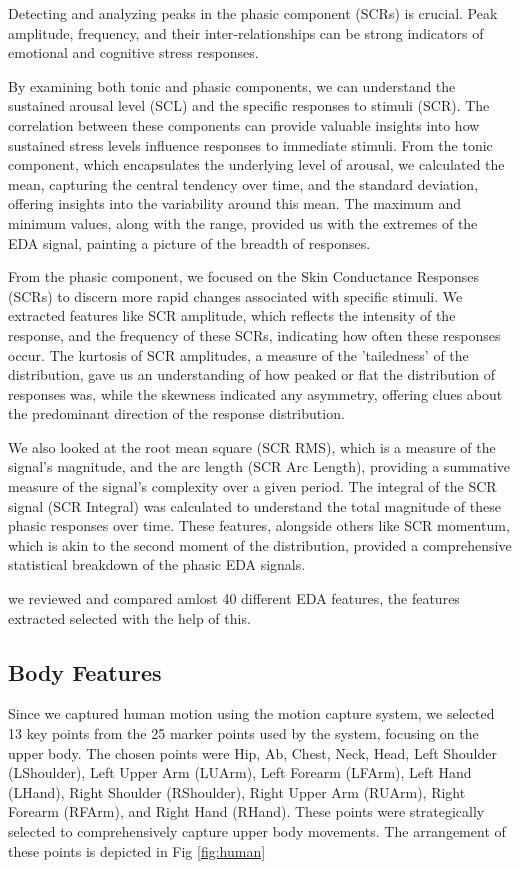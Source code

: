 Detecting and analyzing peaks in the phasic component (SCRs) is crucial. Peak amplitude, frequency, and their inter-relationships can be strong indicators of emotional and cognitive stress responses.

By examining both tonic and phasic components, we can understand the sustained arousal level (SCL) and the specific responses to stimuli (SCR). The correlation between these components can provide valuable insights into how sustained stress levels influence responses to immediate stimuli.
From the tonic component, which encapsulates the underlying level of arousal, we calculated the mean, capturing the central tendency over time, and the standard deviation, offering insights into the variability around this mean. The maximum and minimum values, along with the range, provided us with the extremes of the EDA signal, painting a picture of the breadth of responses.

From the phasic component, we focused on the Skin Conductance Responses (SCRs) to discern more rapid changes associated with specific stimuli. We extracted features like SCR amplitude, which reflects the intensity of the response, and the frequency of these SCRs, indicating how often these responses occur. The kurtosis of SCR amplitudes, a measure of the 'tailedness' of the distribution, gave us an understanding of how peaked or flat the distribution of responses was, while the skewness indicated any asymmetry, offering clues about the predominant direction of the response distribution.

We also looked at the root mean square (SCR RMS), which is a measure of the signal's magnitude, and the arc length (SCR Arc Length), providing a summative measure of the signal's complexity over a given period. The integral of the SCR signal (SCR Integral) was calculated to understand the total magnitude of these phasic responses over time. These features, alongside others like SCR momentum, which is akin to the second moment of the distribution, provided a comprehensive statistical breakdown of the phasic EDA signals.

\textcite[]{EDAFeatures}  we reviewed and compared amlost 40 different EDA features, the features extracted selected with the help of this.

\subsection{Body Features}
Since we captured human motion using the motion capture system, we selected 13 key points from the 25 marker points used by the system, focusing on the upper body. The chosen points were Hip, Ab, Chest, Neck, Head, Left Shoulder (LShoulder), Left Upper Arm (LUArm), Left Forearm (LFArm), Left Hand (LHand), Right Shoulder (RShoulder), Right Upper Arm (RUArm), Right Forearm (RFArm), and Right Hand (RHand). These points were strategically selected to comprehensively capture upper body movements. The arrangement of these points is depicted in Fig \ref{fig:human}

